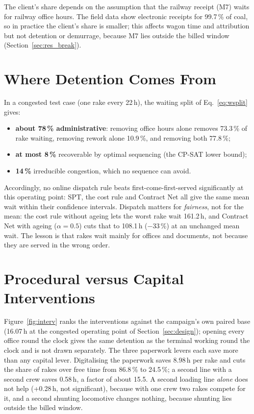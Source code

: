 The client's share depends on the assumption that the railway receipt (M7) waits for railway office hours. The field data show electronic receipts for 99.7\,\% of coal, so in practice the client's share is smaller; this affects wagon time and attribution but not detention or demurrage, because M7 lies outside the billed window (Section~\ref{sec:res_break}).

\section{Where Detention Comes From}
\label{sec:res_where}
In a congested test case (one rake every 22\,h), the waiting split of Eq.~\eqref{eq:wsplit} gives:
\begin{itemize}
    \item \textbf{about 78\,\% administrative}: removing office hours alone removes 73.3\,\% of rake waiting, removing rework alone 10.9\,\%, and removing both 77.8\,\%;
    \item \textbf{at most 8\,\%} recoverable by optimal sequencing (the CP-SAT lower bound);
    \item \textbf{14\,\%} irreducible congestion, which no sequence can avoid.
\end{itemize}
Accordingly, no online dispatch rule beats first-come-first-served significantly at this operating point: SPT, the cost rule and Contract Net all give the same mean wait within their confidence intervals. Dispatch matters for \emph{fairness}, not for the mean: the cost rule without ageing lets the worst rake wait 161.2\,h, and Contract Net with ageing ($\alpha = 0.5$) cuts that to 108.1\,h ($-33$\,\%) at an unchanged mean wait. The lesson is that rakes wait mainly for offices and documents, not because they are served in the wrong order.

\section{Procedural versus Capital Interventions}
\label{sec:res_interv}
Figure~\ref{fig:interv} ranks the interventions against the campaign's own paired base (16.07\,h at the congested operating point of Section~\ref{sec:design}); opening every office round the clock gives the same detention as the terminal working round the clock and is not drawn separately. The three paperwork levers each save more than any capital lever. Digitalising the paperwork saves 8.98\,h per rake and cuts the share of rakes over free time from 86.8\,\% to 24.5\,\%; a second line with a second crew saves 0.58\,h, a factor of about 15.5. A second loading line \emph{alone} does not help (+0.28\,h, not significant), because with one crew two rakes compete for it, and a second shunting locomotive changes nothing, because shunting lies outside the billed window.

